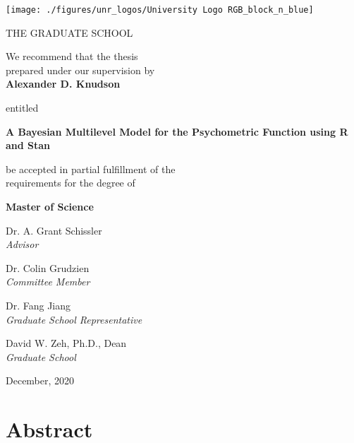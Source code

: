 \newpage
\thispagestyle{empty}
\begin{center}

\texttt{[image: ./figures/unr\_logos/University Logo RGB\_block\_n\_blue]}

THE GRADUATE SCHOOL

\vspace{1em}
We recommend that the thesis \\
prepared under our supervision by\\

\vspace{1em}
\textbf{Alexander D. Knudson}

\vspace{1em}
entitled

\textbf{A Bayesian Multilevel Model for the Psychometric Function using R and Stan}

\vspace{2em}
be accepted in partial fulfillment of the \\
requirements for the degree of

\vspace{1em}
\textbf{Master of Science}

\vspace{1em}
Dr. A. Grant Schissler \\
\textit{Advisor}

\vspace{1em}
Dr. Colin Grudzien\\
\textit{Committee Member}

\vspace{1em}
Dr. Fang Jiang \\
\textit{Graduate School Representative}

\vspace{1em}
David W. Zeh, Ph.D., Dean \\
\textit{Graduate School}

\vspace{1em}
December, 2020
\end{center}


\newpage
\setcounter{page}{1} %
\section*{Abstract}

